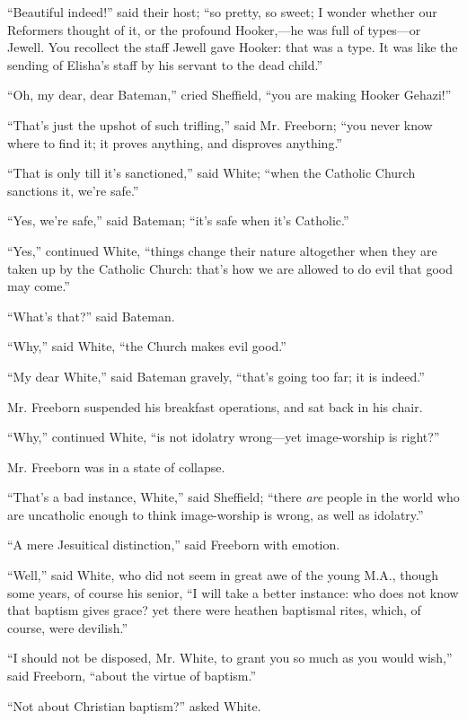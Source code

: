 ``Beautiful indeed!'' said their host; ``so pretty, so
sweet; I wonder whether our Reformers thought of it, or the profound
Hooker,—he was full of types—or Jewell. You recollect the
staff Jewell gave Hooker: that was a type. It was like the sending of
Elisha's staff by his servant to the dead child.''

``Oh, my dear, dear Bateman,'' cried Sheffield, ``you
are making Hooker Gehazi!''

``That's just the upshot of such trifling,'' said Mr.
Freeborn; ``you never know where to find it; it proves anything,
and disproves anything.''

``That is only till it's sanctioned,'' said White;
``when the Catholic Church sanctions it, we're safe.''

``Yes, we're safe,'' said Bateman; ``it's safe when it's
Catholic.''

``Yes,'' continued White, ``things change their nature
altogether when they are taken up by the Catholic Church: that's how
we are allowed to do evil that good may come.''

``What's that?'' said Bateman.

``Why,'' said White, ``the Church makes evil
good.''

``My dear White,'' said Bateman gravely, ``that's going
too far; it is indeed.''

Mr. Freeborn suspended his breakfast operations, and sat back in
his chair.

``Why,'' continued White, ``is not idolatry wrong—yet
image-worship is right?''

Mr. Freeborn was in a state of collapse.

``That's a bad instance, White,'' said Sheffield;
``there \emph{are} people in the world who are uncatholic enough to think
image-worship is wrong, as well as idolatry.''

``A mere Jesuitical distinction,'' said Freeborn with
emotion.

``Well,'' said White, who did not seem in great awe of the
young M.A., though some years, of course his senior, ``I will take
a better instance: who does not know that baptism gives grace? yet
there were heathen baptismal rites, which, of course, were
devilish.''

``I should not be disposed, Mr. White, to grant you so much as
you would wish,'' said Freeborn, ``about the virtue of
baptism.''

``Not about Christian baptism?'' asked White.

